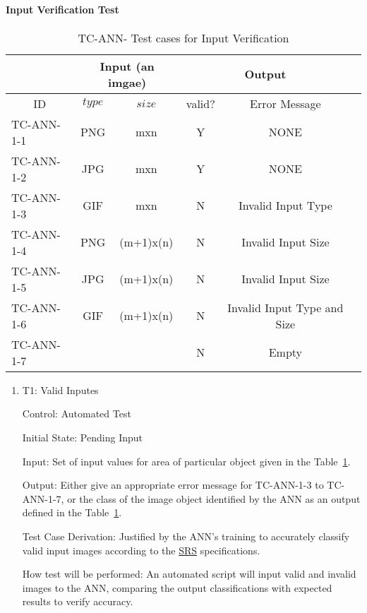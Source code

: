\documentclass[12pt, titlepage]{article}
\begin{document}
\paragraph{Input Verification Test}
\begin{center}
  \begin{table}[h]
  \resizebox{\textwidth}{!}
  { %
      \begin{tabular}{ lccccc }
      \hline
      \multicolumn{1}{l|}{}   & \multicolumn{2}{c|}{Input (an imgae) }                            & \multicolumn{2}{c}{Output} \\ 
      
      \hline
      
      \multicolumn{1}{c|}{ID} &   $type$   &   \multicolumn{1}{c|}{$size$}   &   valid?   &   Error Message \\ \hline
      
      TC-ANN-1-1   &   PNG  & mxn        &  Y  & NONE               \\
      TC-ANN-1-2   &   JPG  & mxn        &  Y  & NONE               \\
      TC-ANN-1-3   &   GIF  & mxn        &  N  & Invalid Input Type  \\ 
      TC-ANN-1-4   &   PNG  & (m+1)x(n)  &  N  & Invalid Input Size   \\
      TC-ANN-1-5   &   JPG  & (m+1)x(n)  &  N  & Invalid Input Size    \\
      TC-ANN-1-6   &   GIF  & (m+1)x(n)  &  N  & Invalid Input Type and Size \\
      TC-ANN-1-7   &        &            &  N  & Empty      \\
      \hline
      
      
      \end{tabular} %
  }
  \caption{TC-ANN- Test cases for Input Verification}
  \label{TCInput}
  \end{table}
  \end{center}

\begin{enumerate}

  \item{T1: Valid Inputes\\}

  Control: Automated Test
  
  Initial State: Pending Input
  
  Input: Set of input values for area of particular object given in the Table~\ref{TCInput}.
  
  Output: Either give an appropriate error message for TC-ANN-1-3 to TC-ANN-1-7,
  or the class of the image object identified by the ANN as an output defined in the Table~\ref{TCInput}.
  
  Test Case Derivation: Justified by the ANN's training to accurately classify 
  valid input images according to the 
  \href{https://github.com/tanya-jp/ANN-CAS741/blob/main/docs/SRS/SRS.pdf}{SRS} specifications.

  How test will be performed: An automated script will input valid and invalid images to the ANN, 
  comparing the output classifications with expected results to verify accuracy.

\end{enumerate}
\end{document}
